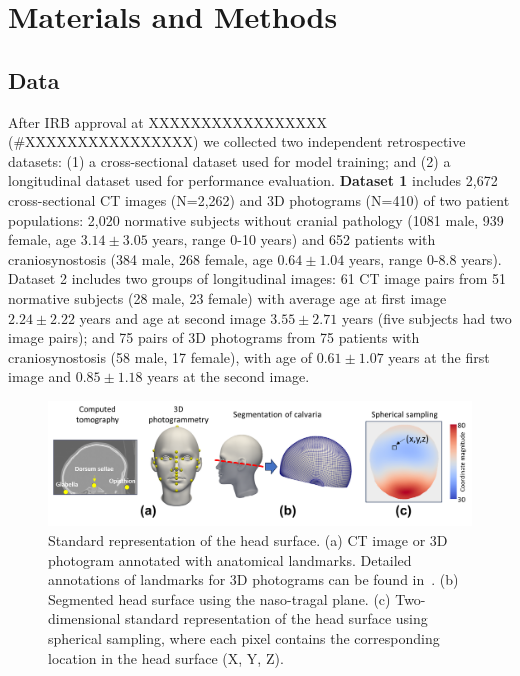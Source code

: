 \documentclass[conference]{IEEEtran}
\begin{document}
\section{Materials and Methods}
\subsection{Data}
After IRB approval at XXXXXXXXXXXXXXXXX (\#XXXXXXXXXXXXXXXX) we collected two independent retrospective datasets: (1) a cross-sectional dataset used for model training; and (2) a longitudinal dataset used for performance evaluation. \textbf{Dataset 1} includes 2,672 cross-sectional CT images (N=2,262) and 3D photograms (N=410) of two patient populations: 2,020 normative subjects without cranial pathology (1081 male, 939 female, age $3.14 \pm 3.05$ years, range 0-10 years) and 652 patients with craniosynostosis (384 male, 268 female, age $0.64 \pm 1.04$ years, range 0-8.8 years). Dataset 2 includes two groups of longitudinal images: 61 CT image pairs from 51 normative subjects (28 male, 23 female) with average age at first image $2.24 \pm 2.22$ years and age at second image $3.55 \pm 2.71$ years (five subjects had two image pairs); and 75 pairs of 3D photograms from 75 patients with craniosynostosis (58 male, 17 female), with age of $0.61 \pm 1.07$ years at the first image and $0.85 \pm 1.18$ years at the second image.
\begin{figure}[!b]
\centering
\includegraphics[width=\columnwidth]{figures/StandardizedRepresentation.png}
\caption{Standard representation of the head surface. (a) CT image or 3D photogram annotated with anatomical landmarks. Detailed annotations of landmarks for 3D photograms can be found in~\cite{Elkhill2023Geometric}. (b) Segmented head surface using the naso-tragal plane. (c) Two-dimensional standard representation of the head surface using spherical sampling, where each pixel contains the corresponding location in the head surface (X, Y, Z).}
\label{fig:standard}
\end{figure}
\end{document}
